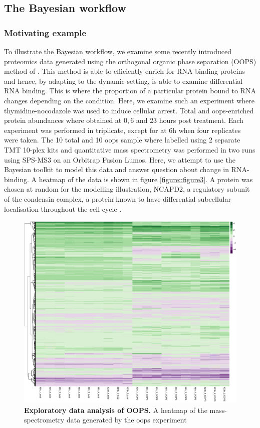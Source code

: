 \documentclass[12pt,english, journal=jpr, layout=twocolumn]{article}
\begin{document}
\subsection{The Bayesian workflow}
\subsubsection{Motivating example}
To illustrate the Bayesian workflow, we examine some recently introduced proteomics data generated using the 
orthogonal organic phase separation (OOPS) method of \citet{Queiroz::2019}. This method is able to efficiently enrich for RNA-binding proteins and hence, by adapting to the dynamic setting, is able to examine
differential RNA binding. This is where the proportion of a particular protein bound to RNA changes depending on the condition. Here, we examine such an experiment where thymidine-nocodazole was used to induce cellular arrest. Total and oops-enriched protein abundances where obtained at $0,6$ and $23$ hours post treatment. Each experiment was performed in triplicate, except for at $6$h when four replicates were taken. The 10 total and 10 oops sample where labelled using 2 separate TMT 10-plex kits and quantitative mass spectrometry was performed in two runs using SPS-MS3 on an Orbitrap Fusion Lumos. Here, we attempt to use the Bayesian toolkit to model this data and answer question about change in RNA-binding. A heatmap of the data is shown in figure \ref{figure::figure3}. A protein was chosen at random for the modelling illustration, NCAPD2, a regulatory subunit of the condensin complex, a protein known to have differential subcellular localisation throughout the cell-cycle \citep{Schmiesing::2000}.

\begin{figure}[h!]
	\centering
	\includegraphics[width =1.1\textwidth]{oopsheatmap.pdf}
	\caption{\textbf{Exploratory data analysis of OOPS.} A heatmap of the mass-spectrometry data generated by the oops experiment}
	\label{figure::figure1}
\end{figure}
\end{document}

